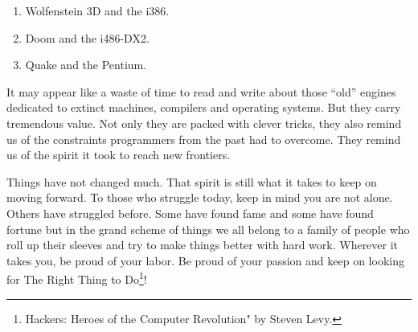 \documentclass[book.tex]{subfiles}
\begin{document}
\begin{enumerate}
\item Wolfenstein 3D and the i386.
\item Doom and the i486-DX2.
\item Quake and the Pentium.
\end{enumerate}

\bigskip

It may appear like a waste of time to read and write about those ``old'' engines dedicated to extinct machines, compilers and operating systems. But they carry tremendous value. Not only they are packed with clever tricks, they also remind us of the constraints programmers from the past had to overcome. They remind us of the spirit it took to reach new frontiers.\\
\par
Things have not changed much. That spirit is still what it takes to keep on moving forward. To those who struggle today, keep in mind you are not alone. Others have struggled before. Some have found fame and some have found fortune but in the grand scheme of things we all belong to a family of people who roll up their sleeves and try to make things better with hard work. Wherever it takes you, be proud of your labor. Be proud of your passion and keep on looking for The Right Thing to Do\footnote{Hackers: Heroes of the Computer Revolution" by Steven Levy.}!\\
\end{document}
